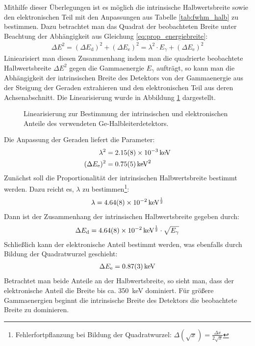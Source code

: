 \documentclass[11pt, a4paper]{article}
\numberwithin{equation}{section}
\begin{document}
Mithilfe dieser Überlegungen ist es möglich die intrinsische Halbwertsbreite sowie den elektronischen Teil mit den Anpassungen aus Tabelle \ref{tab:fwhm_halb} zu bestimmen.
Dazu betrachtet man das Quadrat der beobachteten Breite unter Beachtung der Abhängigkeit aus Gleichung \eqref{eq:prop_energiebreite}:
\begin{align}
	\Delta E^2 = (\Delta E_\mathrm{d})^2 + (\Delta E_\mathrm{e})^2 = \lambda^2 \cdot E_\gamma + (\Delta E_\mathrm{e})^2
\end{align}
Liniearisiert man diesen Zusammenhang indem man die quadrierte beobachtete Halbwertsbreite $\Delta E^2$ gegen die Gammaenergie $E_\gamma$ aufträgt, so kann man die Abhängigkeit der intrinsischen Breite des Detektors von der Gammaenergie aus der Steigung der Geraden extrahieren und den elektronischen Teil aus deren Achsenabschnitt.
Die Linearisierung wurde in Abbildung \ref{fig:lin_fwhm} dargestellt.
\begin{figure}[ht]
	\centering
	
	\caption{Linearisierung zur Bestimmung der intrinsischen und elektronischen Anteile des verwendeten Ge-Halbleiterdetektors.}
	\label{fig:lin_fwhm}
\end{figure}
Die Anpassung der Geraden liefert die Parameter:
\begin{align*}
	\lambda^2 &= \SI{2.15 +- 0.08e-3}{\kilo\electronvolt}\\
	(\Delta E_\mathrm{e})^2 &= \SI{0.75 +- 0.05}{\kilo\electronvolt\squared}
\end{align*}
Zunächst soll die Proportionalität der intrinsischen Halbwertsbreite bestimmt werden.
Dazu reicht es, $\lambda$ zu bestimmen\footnote{
Fehlerfortpflanzung bei Bildung der Quadratwurzel: $\Delta (\sqrt{x}) = \frac{\Delta x}{2 \sqrt{x}} $
}:
\begin{align*}
	\lambda = \SI{4.64 +-0.08e-2}{\kilo\electronvolt\tothe{\frac{1}{2}}}
\end{align*}
Dann ist der Zusammenhang der intrinsischen Halbwertsbreite gegeben durch:
\begin{align}
	\Delta E_\mathrm{d} = \SI{4.64 +-0.08e-2}{\kilo\electronvolt\tothe{\frac{1}{2}}} \cdot \sqrt{E_\gamma}
\end{align}
Schließlich kann der elektronische Anteil bestimmt werden, was ebenfalls durch Bildung der Quadratwurzel geschieht:
\begin{align}
	\Delta E_\mathrm{e} = \SI{0.87 +- 0.03}{\kilo\electronvolt}
\end{align}
Betrachtet man beide Anteile an der Halbwertsbreite, so sieht man, dass der elektronische Anteil die Breite bis ca. \SI{350}{\kilo\electronvolt} dominiert.
Für größere Gammaenergien beginnt die intrinsische Breite des Detektors die beobachtete Breite zu dominieren.
\end{document}
